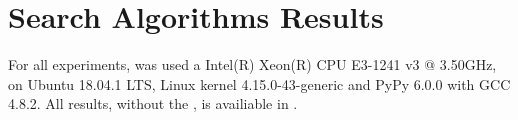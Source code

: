 \documentclass[a4paper]{article}
\begin{document}
\section{Search Algorithms Results}

For all experiments, was used a Intel(R) Xeon(R) CPU E3-1241 v3 @ 3.50GHz, on Ubuntu 18.04.1 LTS, Linux kernel 4.15.0-43-generic and PyPy 6.0.0 with GCC 4.8.2. All results, without the , is availiable in \cite{githubYsraellAIND}.

\end{document}
